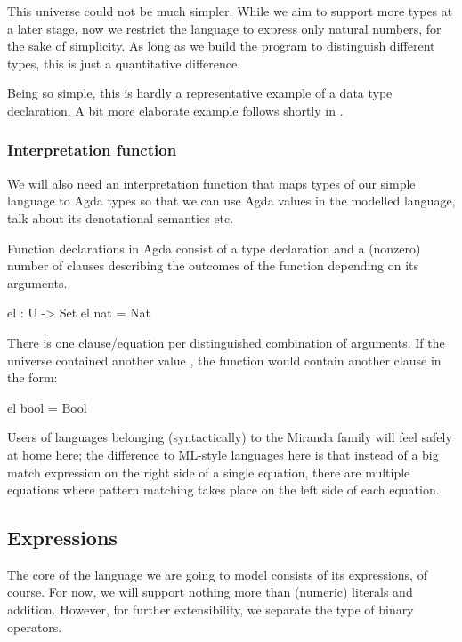 \noindent This universe could not be much simpler. While we aim to support more
types at a later stage, now we restrict the language to express only natural
numbers, for the sake of simplicity. As long as we build the program to
distinguish different types, this is just a quantitative difference.

Being so simple, this is hardly a representative example of a data type
declaration. A bit more elaborate example follows shortly in .

\subsubsection{Interpretation function}

We will also need an interpretation function that maps
types of our simple language to Agda types so that we can use Agda values in
the modelled language, talk about its denotational semantics etc.

Function declarations in Agda consist of a type declaration and a (nonzero)
number of clauses describing the outcomes of the function depending on
its arguments.

\begin{code}
  el : U -> Set
  el nat = Nat
\end{code}

\noindent There is one clause/equation per distinguished combination of arguments. If the
universe  contained another value , the function 
would contain another clause in the form:
\begin{code}
  el bool = Bool
\end{code}
Users of languages belonging (syntactically) to the Miranda family will feel safely at
home here; the difference to ML-style languages here is that instead of a big match expression
on the right side of a single equation, there are multiple equations where pattern
matching takes place on the left side of each equation.

\subsection{Expressions}

The core of the language we are going to model consists of its expressions, of
course. For now, we will support nothing more than (numeric) literals and addition.
However, for further extensibility, we separate the type of binary operators.

